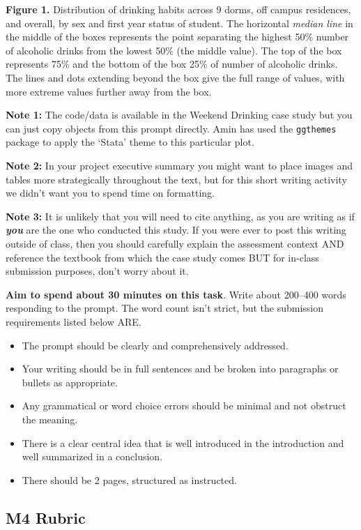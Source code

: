 \documentclass[
  openany]{book}
\begin{document}
\textbf{Figure 1.} Distribution of drinking habits across 9 dorms, off campus residences, and overall, by sex and first year status of student. The horizontal \emph{median line} in the middle of the boxes represents the point separating the highest 50\% number of alcoholic drinks from the lowest 50\% (the middle value). The top of the box represents 75\% and the bottom of the box 25\% of number of alcoholic drinks. The lines and dots extending beyond the box give the full range of values, with more extreme values further away from the box.

\textbf{Note 1:} The code/data is available in the Weekend Drinking case study but you can just copy objects from this prompt directly. Amin has used the \texttt{ggthemes} package to apply the `Stata' theme to this particular plot.

\textbf{Note 2:} In your project executive summary you might want to place images and tables more strategically throughout the text, but for this short writing activity we didn't want you to spend time on formatting.

\textbf{Note 3:} It is unlikely that you will need to cite anything, as you are writing as if \textbf{\emph{you}} are the one who conducted this study. If you were ever to post this writing outside of class, then you should carefully explain the assessment context AND reference the textbook from which the case study comes BUT for in-class submission purposes, don't worry about it.

\textbf{Aim to spend about 30 minutes on this task}. Write about 200--400 words responding to the prompt. The word count isn't strict, but the submission requirements listed below ARE.

\begin{itemize}
\item
  The prompt should be clearly and comprehensively addressed.
\item
  Your writing should be in full sentences and be broken into paragraphs or bullets as appropriate.
\item
  Any grammatical or word choice errors should be minimal and not obstruct the meaning.
\item
  There is a clear central idea that is well introduced in the introduction and well summarized in a conclusion.
\item
  There should be 2 pages, structured as instructed.
\end{itemize}

\hypertarget{m4-rubric}{%
\subsection{M4 Rubric}\label{m4-rubric}}
\end{document}
